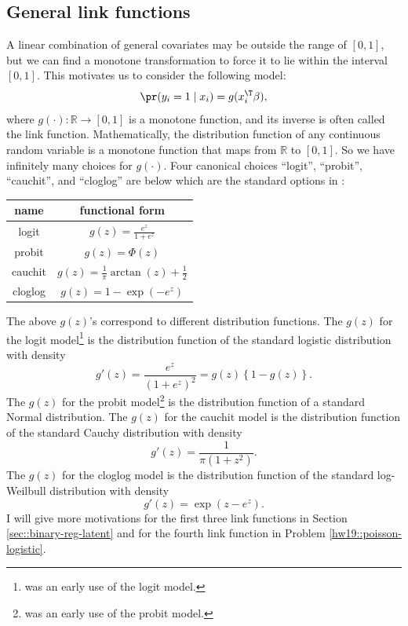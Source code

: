 \subsection{General link functions}

A linear combination of general covariates may be outside the range
of $[0,1]$, but we can find a monotone transformation to force it
to lie within the interval $[0,1]$. This motivates us to consider the
following model:
\[
\pr(y_{i}=1\mid x_{i})=g(x_{i}^{\T}\beta),
\]
where $g(\cdot):\mathbb{R}\rightarrow[0,1]$ is a monotone function,
and its inverse is often called the link function. Mathematically,
the distribution function of any continuous random variable is a monotone function that maps from $\mathbb{R}$
to $[0,1]$. So we have infinitely many choices for $g(\cdot)$. Four
canonical choices ``logit'', ``probit'', ``cauchit'', and ``cloglog'' are below which are the standard options in : 

 
\begin{tabular}{|c|c|}
name & functional form\tabularnewline
\hline 
\hline 
logit & $g(z)=\frac{e^{z}}{1+e^{z}}$\tabularnewline
\hline 
probit & $g(z)=\Phi(z)$\tabularnewline
\hline 
cauchit & $g(z)=\frac{1}{\pi}\arctan(z)+\frac{1}{2}$\tabularnewline
\hline 
cloglog & $g(z)=1-\exp(-e^{z})$\tabularnewline
\end{tabular} 
 



The above $g(z)$'s correspond to different distribution functions. The $g(z)$ for the logit model\footnote{\citet{berkson1944application} was an early use of the logit model.}
is the distribution function of the standard logistic distribution
with density
\begin{equation}
g'(z)=\frac{e^{z}}{(1+e^{z})^{2}}=g(z)\left\{ 1-g(z)\right\} . \label{eq:densityoflogit}
\end{equation}
The $g(z)$ for the probit model\footnote{\citet{bliss1934method} was an early use of the probit model.} is the distribution function of a
standard Normal distribution. The $g(z)$ for the cauchit model is
the distribution function of the standard Cauchy distribution with
density
\[
g'(z)=\frac{1}{\pi(1+z^{2})} .
\]
The $g(z)$ for the cloglog model is the distribution function of the standard
log-Weilbull distribution with density
\[
g'(z)=\exp(z-e^{z}).
\]
I will give more motivations for the first three link functions in Section \ref{sec::binary-reg-latent} and for the fourth link function in Problem \ref{hw19::poisson-logistic}. 


